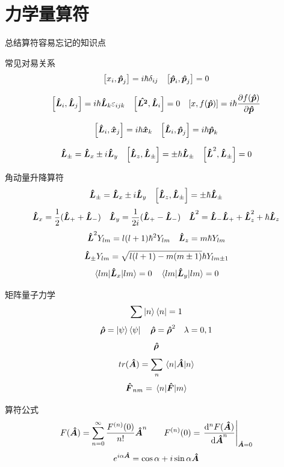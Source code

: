 \documentclass{article}
\begin{document}
    \section{力学量算符}
        \begin{formal}
            总结算符容易忘记的知识点   
            
            常见对易关系
            $$ \comm{x_{i}}{\vu*{p}_{j}} = i \hbar \delta_{ij} \quad \comm{\vu*{p}_{i}}{\vu*{p}_{j}} = 0 $$
            
            $$\comm{\vu*{L}_{i}}{\vu*{L}_{j}} = i\hbar \vu*{L}_{k} \varepsilon_{ijk}  
            \quad \comm{\vu*{L^{2}}}{\vu*{L}_{i}} = 0 \quad \comm{x}{f(\vu*{p})} = i \hbar \pdv{f(\vu*{p})}{\vu*{p}}
            $$

            $$  \comm{\vu*{L}_{i}}{\vu*{x}_{j}} = i \hbar \vu*{x}_{k} \quad \comm{\vu*{L}_{i}}{\vu*{p}_{j}} = i \hbar \vu*{p}_{k}
            $$

            $$\vu*{L}_{\pm} = \vu*{L}_{x} \pm  i \vu*{L}_{y} \quad \comm{\vu*{L}_{z}}{\vu*{{L}}_{\pm}} = \pm \hbar \vu*{L}_{\pm} \quad \comm{\vu*{L}^{2}}{\vu*{{L}}_{\pm}} = 0  $$

            角动量升降算符
            $$ \vu*{L}_{\pm} = \vu*{L}_{x} \pm  i \vu*{L}_{y} \quad \comm{\vu*{L}_{z}}{\vu*{{L}}_{\pm}} = \pm \hbar \vu*{L}_{\pm} $$
            $$ \vu*{L}_{x}  = \frac{1}{2} (\vu*{L}_{+} + \vu*{L}_{-}) \quad \vu*{L}_{y} = \frac{1}{2i} (\vu*{L}_{+} - \vu*{L}_{-}) \quad \vu*{L}^{2} = \vu*{L}_{-} \vu*{L}_{+} + \vu*{L}_{z}^{2} + \hbar \vu*{L}_{z} $$
            $$ \vu*{L}^{2} Y_{lm} = l(l+1)\hbar^{2} Y_{lm} \quad \vu*{L}_{z} = m\hbar Y_{lm}$$
            $$ \vu*{L}_{\pm} Y_{lm} = \sqrt{l(l+1) - m(m \pm 1)}  \hbar Y_{lm \pm 1} $$
            $$ \ev{\vu*{L}_{x}}{lm} = 0 \quad \ev{\vu*{L}_{y}}{lm} = 0  $$

            矩阵量子力学
            $$ \sum \ket{n}\bra{n} = 1 $$
            $$ \vu*{\rho} = \ket{\psi} \bra{\psi} \quad \vu*{\rho} =  \vu*{\rho}^{2} \quad \lambda = 0,1$$
            $$ \vu*{\rho} $$
            $$ tr(\vu*{A}) = \sum_{n} \mel{n}{\vu*{A}}{n} $$
            $$ \vu*{F}_{nm} = \mel{n}{\vu*{F}}{m} $$
                
            
            
            算符公式
            $$ F(\vu*{A}) = \sum_{n=0}^{\infty} \frac{ F^{(n)}(0) }{n!} \vu*{A}^{n} \qquad F^{(n)}(0) = \eval{\dv[n]{F(\vu*{A})}{\vu*{A}} }_{\vu*{A}=0}  $$
            $$ e^{i \alpha \vu*{A}}  =  \cos{\alpha} + i \sin{\alpha}\vu*{A} $$


\end{formal}
\end{document}

